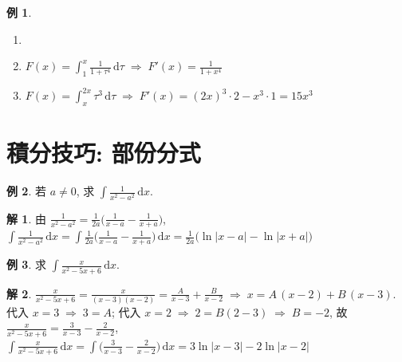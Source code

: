 \documentclass[12pt]{extarticle}
\newcommand{\ds}{\displaystyle}
\newcommand{\ie}{\;\Longrightarrow\;}
\theoremstyle{definition}
\newtheorem*{ex}{例}
\newtheorem*{sol}{解}
\begin{document}
\begin{ex} 
  \begin{enumerate}\setlength{\itemsep}{0pt}
    \item[]
    \item $\ds F(x) = \int_1^x\frac{1}{1 + \tau^4}\,\mathrm{d}\tau \ie F'(x) = \frac{1}{1 + x^4}$ 
    \item $\ds F(x) = \int_{x}^{2x}\tau^3\,\mathrm{d}\tau \ie F'(x) = (2x)^3\cdot 2 - x^3\cdot 1 = 15x^3$
  \end{enumerate}
\end{ex}

\section*{積分技巧: 部份分式}

\begin{ex}
  若 $a\ne 0$, 求 $\ds\int\!\frac{1}{x^2 - a^2}\,\text{d}x$. 
\end{ex}

\begin{sol}
  由 $\ds\frac{1}{x^2 - a^2} = \frac{1}{2a}\bigg(\frac{1}{x - a} - \frac{1}{x + a}\bigg)$, $\ds\int\!\frac{1}{x^2 - a^2}\,\text{d}x = \int\frac{1}{2a}\bigg(\frac{1}{x - a} - \frac{1}{x + a}\bigg)\,\text{d}x = \frac{1}{2a}\big(\ln|x - a| - \ln|x + a|\big)$
\end{sol}

\begin{ex}
  求 $\ds\int\!\frac{x}{x^2 - 5x + 6}\,\text{d}x$. 
\end{ex}

\begin{sol}
  $\ds\frac{x}{x^2 - 5x + 6} = \frac{x}{(x - 3)(x - 2)} = \frac{A}{x - 3} + \frac{B}{x - 2} \ie x = A\,(x - 2) + B\,(x - 3)$. 代入 $x = 3\ie 3 = A$; 代入 $x = 2\ie 2 = B(2 - 3) \ie B = -2$, 故 $\ds\frac{x}{x^2 - 5x + 6} = \frac{3}{x - 3} - \frac{2}{x - 2}$, $\ds\int\!\frac{x}{x^2 - 5x + 6}\,\text{d}x = \int\bigg(\frac{3}{x - 3} - \frac{2}{x - 2}\bigg)\,\text{d}x = 3\ln|x - 3| - 2\ln|x - 2|$
\end{sol}
\end{document}
